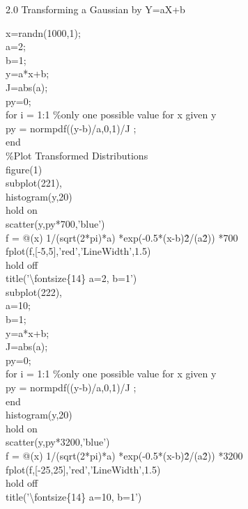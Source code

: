 \documentclass[twoside,twocolumn]{article}
\begin{document}
\begin{large}
2.0 Transforming a Gaussian by Y=aX+b
\end{large}
\newline
\begin{itshape}
x=randn(1000,1);\\
a=2;\\
b=1;\\
y=a*x+b;\\
J=abs(a);\\

py=0;\\
for i = 1:1 \%only one possible value for x given y\\
    py = normpdf((y-b)/a,0,1)/J ;\\
end\\
    
\%Plot Transformed Distributions\\
figure(1)\\
subplot(221),\\
histogram(y,20)\\
hold on\\
scatter(y,py*700,'blue')\\
f = @(x) 1/(sqrt(2*pi)*a) *exp(-0.5*(x-b)\^2/(a\^2)) *700\\
fplot(f,[-5,5],'red','LineWidth',1.5)\\
hold off\\
title('\textbackslash fontsize\{14\} a=2, b=1')\\

subplot(222),\\
a=10;\\
b=1;\\
y=a*x+b;\\
J=abs(a);\\
py=0;\\
for i = 1:1 \%only one possible value for x given y\\
    py = normpdf((y-b)/a,0,1)/J ;\\
end\\
histogram(y,20)\\
hold on\\
scatter(y,py*3200,'blue')\\
f = @(x) 1/(sqrt(2*pi)*a) *exp(-0.5*(x-b)\^2/(a\^2)) *3200\\
fplot(f,[-25,25],'red','LineWidth',1.5)\\
hold off\\
title('\textbackslash fontsize\{14\} a=10, b=1')\\


\end{itshape}
\end{document}
